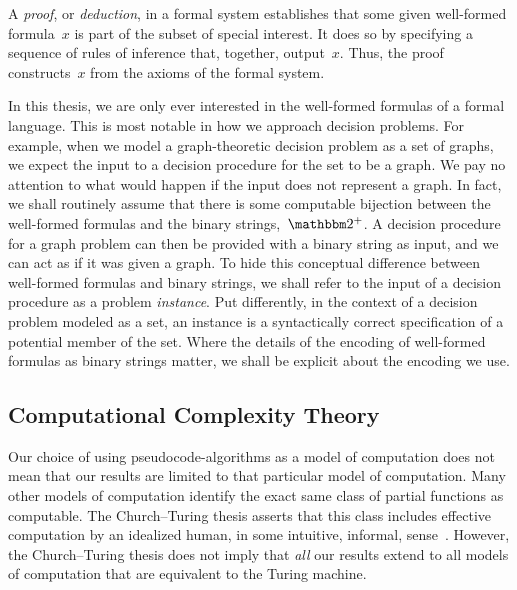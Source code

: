 A \emph{proof}, or \emph{deduction}, in a formal system establishes that some given well-formed formula~$x$ is part of the subset of special interest.
It does so by specifying a sequence of rules of inference that, together, output~$x$.
Thus, the proof constructs~$x$ from the axioms of the formal system.

In this thesis, we are only ever interested in the well-formed formulas of a formal language.
This is most notable in how we approach decision problems.
For example, when we model a graph-theoretic decision problem as a set of graphs, we expect the input to a decision procedure for the set to be a graph.
We pay no attention to what would happen if the input does not represent a graph.
In fact, we shall routinely assume that there is some computable bijection between the well-formed formulas and the binary strings,~$\binary^+$.
A decision procedure for a graph problem can then be provided with a binary string as input, and we can act as if it was given a graph.
To hide this conceptual difference between well-formed formulas and binary strings, we shall refer to the input of a decision procedure as a problem \emph{instance}.
Put differently, in the context of a decision problem modeled as a set, an instance is a syntactically correct specification of a potential member of the set.
Where the details of the encoding of well-formed formulas as binary strings matter, we shall be explicit about the encoding we use.


\subsection{Computational Complexity Theory}

Our choice of using pseudocode-algorithms as a model of computation does not mean that our results are limited to that particular model of computation.
Many other models of computation identify the exact same class of partial functions as computable.
The Church--Turing thesis asserts that this class includes effective computation by an idealized human, in some intuitive, informal, sense~\parencite{vanemdeboas1990machine,goldreich2008computational}.
However, the Church--Turing thesis does not imply that \emph{all} our results extend to all models of computation that are equivalent to the Turing machine.

